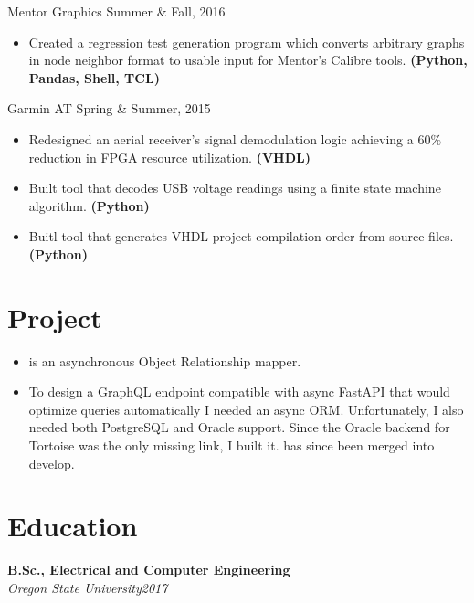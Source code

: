 \documentclass[]{friggeri-cv}
\begin{document}
         {Mentor Graphics}
         {Summer \& Fall, 2016}
         \begin{itemize}
           \item Created a regression test generation program which converts arbitrary 
                 graphs in node neighbor format to usable input for Mentor's Calibre tools. {\bf\footnotesize(Python, Pandas, Shell, TCL)}
        \end{itemize}

         {Garmin AT}
         {Spring \& Summer, 2015}
         \begin{itemize}
           \item Redesigned an aerial receiver's signal demodulation logic achieving a 
                 $60\%$ reduction in FPGA resource utilization. {\bf\footnotesize(VHDL)}
           \item Built tool that decodes USB voltage readings using a finite state machine algorithm. {\bf\footnotesize(Python)}
           \item Buitl tool that generates VHDL project compilation order from source files. {\bf\footnotesize(Python)}
         \end{itemize}

\section{Project}  
         \begin{itemize}
           \item {} is an asynchronous Object Relationship mapper.
           \item To design a GraphQL endpoint compatible with async FastAPI that would optimize queries automatically I needed an async ORM.
                 Unfortunately, I also needed both PostgreSQL and Oracle support. Since the Oracle backend for Tortoise was the only
                 missing link, I built it.  has since been merged into develop.
         \end{itemize} 

\section{Education}
    \textbf{B.Sc., Electrical and Computer Engineering} \\
    \textit{{Oregon State University}\hfill 2017 }
\end{document}
